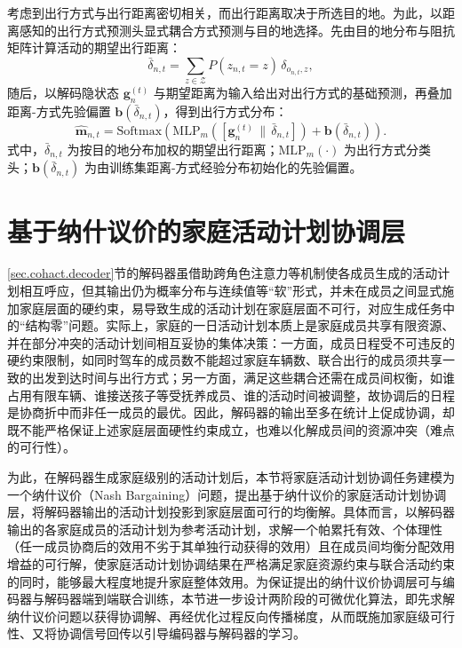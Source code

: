 考虑到出行方式与出行距离密切相关，而出行距离取决于所选目的地。为此，以距离感知的出行方式预测头显式耦合方式预测与目的地选择。先由目的地分布与阻抗矩阵计算活动的期望出行距离：
\begin{equation}
\bar{\delta}_{n,t}=\sum_{z\in\mathcal{Z}}P\!\left(z_{n,t}=z\right)\,\delta_{o_{n,t},z},
\label{eq.cohact.expdist}
\end{equation}
随后，以解码隐状态 $\mathbf{g}_n^{(t)}$ 与期望距离为输入给出对出行方式的基础预测，再叠加距离-方式先验偏置 $\mathbf{b}(\bar{\delta}_{n,t})$，得到出行方式分布：
\begin{equation}
\hat{\mathbf{m}}_{n,t}=\mathrm{Softmax}\!\left(\mathrm{MLP}_m\!\left(\left[\mathbf{g}_n^{(t)}\,\|\,\bar{\delta}_{n,t}\right]\right)+\mathbf{b}\!\left(\bar{\delta}_{n,t}\right)\right).
\label{eq.cohact.mode}
\end{equation}
式中，$\bar{\delta}_{n,t}$ 为按目的地分布加权的期望出行距离；$\mathrm{MLP}_m(\cdot)$ 为出行方式分类头；$\mathbf{b}(\bar{\delta}_{n,t})$ 为由训练集距离-方式经验分布初始化的先验偏置。
 
\section{基于纳什议价的家庭活动计划协调层}\label{sec.cohact.nash}

\ref{sec.cohact.decoder}节的解码器虽借助跨角色注意力等机制使各成员生成的活动计划相互呼应，但其输出仍为概率分布与连续值等“软”形式，并未在成员之间显式施加家庭层面的硬约束，易导致生成的活动计划在家庭层面不可行，对应生成任务中的“结构零”问题。实际上，家庭的一日活动计划本质上是家庭成员共享有限资源、并在部分冲突的活动计划间相互妥协的集体决策：一方面，成员日程受不可违反的硬约束限制，如同时驾车的成员数不能超过家庭车辆数、联合出行的成员须共享一致的出发到达时间与出行方式；另一方面，满足这些耦合还需在成员间权衡，如谁占用有限车辆、谁接送孩子等受抚养成员、谁的活动时间被调整，故协调后的日程是协商折中而非任一成员的最优。因此，解码器的输出至多在统计上促成协调，却既不能严格保证上述家庭层面硬性约束成立，也难以化解成员间的资源冲突（难点的可行性）。

为此，在解码器生成家庭级别的活动计划后，本节将家庭活动计划协调任务建模为一个纳什议价（Nash Bargaining）问题，提出基于纳什议价的家庭活动计划协调层，将解码器输出的活动计划投影到家庭层面可行的均衡解。具体而言，以解码器输出的各家庭成员的活动计划为参考活动计划，求解一个帕累托有效、个体理性（任一成员协商后的效用不劣于其单独行动获得的效用）且在成员间均衡分配效用增益的可行解，使家庭活动计划协调结果在严格满足家庭资源约束与联合活动约束的同时，能够最大程度地提升家庭整体效用。为保证提出的纳什议价协调层可与编码器与解码器端到端联合训练，本节进一步设计两阶段的可微优化算法，即先求解纳什议价问题以获得协调解、再经优化过程反向传播梯度，从而既施加家庭级可行性、又将协调信号回传以引导编码器与解码器的学习。


